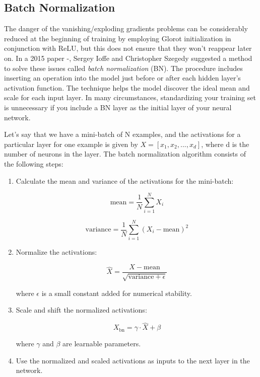 \subsection{Batch Normalization}
The danger of the vanishing/exploding gradients problems can be considerably reduced at the beginning of training by employing Glorot initialization in conjunction with ReLU, but this does not ensure that they won't reappear later on.
In a 2015 paper -, Sergey Ioffe and Christopher Szegedy suggested a method to solve these issues called \textit{batch normalization} (BN). The procedure includes inserting an operation into the model just before or after each hidden layer's activation function. The technique helps the model discover the ideal mean and scale for each input layer. In many circumstances, standardizing your training set is unnecessary if you include a BN layer as the initial layer of your neural network.

\hspace{1cm}

Let's say that we have a mini-batch of N examples, and the activations for a particular layer for one example is given by $X = [x_1, x_2, ..., x_d]$, where d is the number of neurons in the layer. The batch normalization algorithm consists of the following steps:

\begin{enumerate}
\item Calculate the mean and variance of the activations for the mini-batch:

\begin{equation}
\text{mean} = \frac{1}{N} \sum_{i=1}^{N} X_i
\end{equation}

\begin{equation}
\text{variance} = \frac{1}{N} \sum_{i=1}^{N} (X_i - \text{mean})^2
\end{equation}

\item Normalize the activations:

\begin{equation}
\hat{X} = \frac{X - \text{mean}}{\sqrt{\text{variance} + \epsilon}}
\end{equation}

where $\epsilon$ is a small constant added for numerical stability.

\item Scale and shift the normalized activations:

\begin{equation}
X_{\text{bn}} = \gamma \cdot \hat{X} + \beta
\end{equation}

where $\gamma$ and $\beta$ are learnable parameters.

\item Use the normalized and scaled activations as inputs to the next layer in the network.
\end{enumerate}

